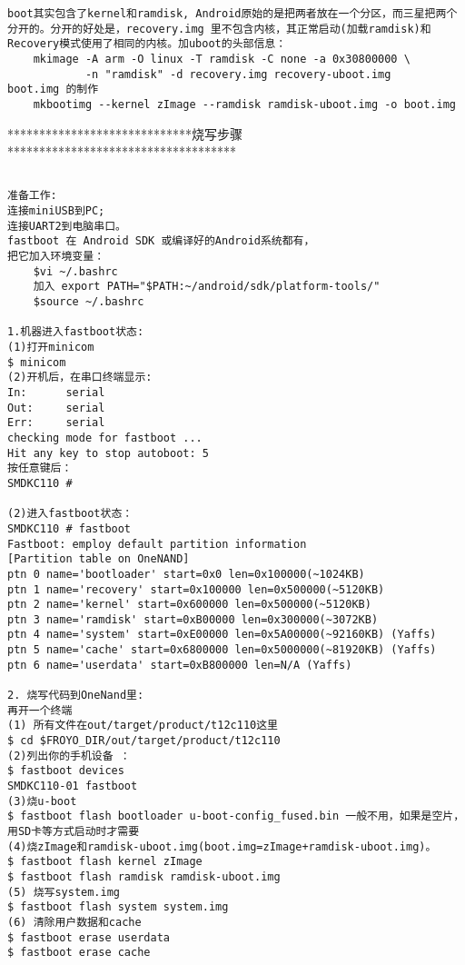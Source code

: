\documentclass[a4paper,titlepage]{article}
\begin{document}
\begin{verbatim}
boot其实包含了kernel和ramdisk, Android原始的是把两者放在一个分区，而三星把两个分开的。分开的好处是，recovery.img 里不包含内核，其正常启动(加载ramdisk)和Recovery模式使用了相同的内核。加uboot的头部信息：
    mkimage -A arm -O linux -T ramdisk -C none -a 0x30800000 \
            -n "ramdisk" -d recovery.img recovery-uboot.img
boot.img 的制作
    mkbootimg --kernel zImage --ramdisk ramdisk-uboot.img -o boot.img
\end{verbatim}

*****************************烧写步骤************************************
\begin{verbatim} 

准备工作:
连接miniUSB到PC;
连接UART2到电脑串口。
fastboot 在 Android SDK 或编译好的Android系统都有， 
把它加入环境变量：
    $vi ~/.bashrc 
    加入 export PATH="$PATH:~/android/sdk/platform-tools/"
    $source ~/.bashrc

1.机器进入fastboot状态: 
(1)打开minicom 
$ minicom 
(2)开机后，在串口终端显示:
In:      serial
Out:     serial
Err:     serial
checking mode for fastboot ...
Hit any key to stop autoboot: 5
按任意键后：
SMDKC110 #

(2)进入fastboot状态： 
SMDKC110 # fastboot
Fastboot: employ default partition information
[Partition table on OneNAND]
ptn 0 name='bootloader' start=0x0 len=0x100000(~1024KB) 
ptn 1 name='recovery' start=0x100000 len=0x500000(~5120KB) 
ptn 2 name='kernel' start=0x600000 len=0x500000(~5120KB) 
ptn 3 name='ramdisk' start=0xB00000 len=0x300000(~3072KB) 
ptn 4 name='system' start=0xE00000 len=0x5A00000(~92160KB) (Yaffs)
ptn 5 name='cache' start=0x6800000 len=0x5000000(~81920KB) (Yaffs)
ptn 6 name='userdata' start=0xB800000 len=N/A (Yaffs)

2. 烧写代码到OneNand里:
再开一个终端
(1) 所有文件在out/target/product/t12c110这里
$ cd $FROYO_DIR/out/target/product/t12c110
(2)列出你的手机设备 ：
$ fastboot devices
SMDKC110-01 fastboot
(3)烧u-boot
$ fastboot flash bootloader u-boot-config_fused.bin 一般不用，如果是空片，用SD卡等方式启动时才需要
(4)烧zImage和ramdisk-uboot.img(boot.img=zImage+ramdisk-uboot.img)。
$ fastboot flash kernel zImage
$ fastboot flash ramdisk ramdisk-uboot.img
(5) 烧写system.img
$ fastboot flash system system.img
(6) 清除用户数据和cache
$ fastboot erase userdata
$ fastboot erase cache
\end{verbatim}




\end{document}
